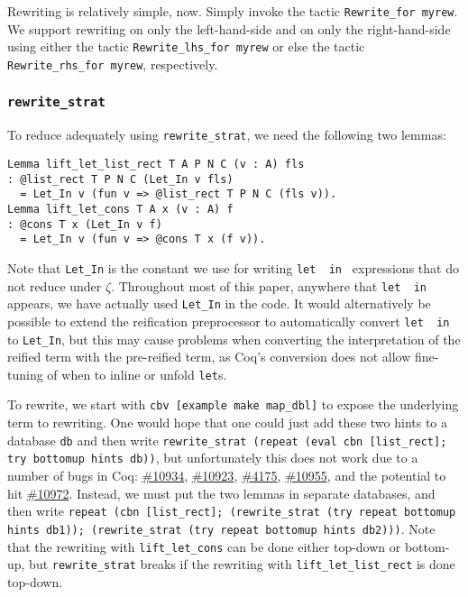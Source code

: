 \documentclass[sigplan,10pt,review,anonymous]{acmart}\settopmatter{printfolios=true,printccs=false,printacmref=false}
\makeatletter
\newcommand{\coqbug}[1]{\href{https://github.com/coq/coq/issues/#1}{\##1}}
\newcommand{\letin}[1][{\ensuremath{\cdots}}{\ensuremath{\cdots}}]{%
  \texttt{let }\@firstoftwo#1\texttt{ in }\@secondoftwo#1
}
\makeatother
\begin{document}
Rewriting is relatively simple, now.
Simply invoke the tactic \texttt{Rewrite_for myrew}.
We support rewriting on only the left-hand-side and on only the right-hand-side using either the tactic \texttt{Rewrite_lhs_for myrew} or else the tactic \texttt{Rewrite_rhs_for myrew}, respectively.

\subsubsection{\texorpdfstring{\texttt{rewrite\_strat}}{rewrite\_strat}}

To reduce adequately using \texttt{rewrite\_strat}, we need the following two lemmas:
\begin{verbatim}
Lemma lift_let_list_rect T A P N C (v : A) fls
: @list_rect T P N C (Let_In v fls)
  = Let_In v (fun v => @list_rect T P N C (fls v)).
Lemma lift_let_cons T A x (v : A) f
: @cons T x (Let_In v f)
  = Let_In v (fun v => @cons T x (f v)).
\end{verbatim}

Note that \texttt{Let_In} is the constant we use for writing \letin{} expressions that do not reduce under $\zeta$.
Throughout most of this paper, anywhere that \letin{} appears, we have actually used \texttt{Let_In} in the code.
It would alternatively be possible to extend the reification preprocessor to automatically convert \letin{} to \texttt{Let_In}, but this may cause problems when converting the interpretation of the reified term with the pre-reified term, as Coq's conversion does not allow fine-tuning of when to inline or unfold \texttt{let}s.

To rewrite, we start with \texttt{cbv [example make map_dbl]} to expose the underlying term to rewriting.
One would hope that one could just add these two hints to a database \texttt{db} and then write \texttt{rewrite\_strat (repeat (eval cbn [list\_rect]; try bottomup hints db))}, but unfortunately this does not work due to a number of bugs in Coq: \coqbug{10934}, \coqbug{10923}, \coqbug{4175}, \coqbug{10955}, and the potential to hit \coqbug{10972}.
Instead, we must put the two lemmas in separate databases, and then write \texttt{repeat (cbn [list\_rect]; (rewrite\_strat (try repeat bottomup hints db1)); (rewrite\_strat (try repeat bottomup hints db2)))}.
Note that the rewriting with \texttt{lift_let_cons} can be done either top-down or bottom-up, but \texttt{rewrite\_strat} breaks if the rewriting with \texttt{lift_let_list_rect} is done top-down.
\end{document}
